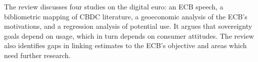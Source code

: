 The review discusses four studies on the digital euro: an ECB speech, a bibliometric mapping of CBDC literature, a geoeconomic analysis of the ECB's motivations, and a regression analysis of potential use. It argues that sovereignty goals depend on usage, which in turn depends on consumer attitudes. The review also identifies gaps in linking estimates to the ECB’s objective and areas which need further research.
